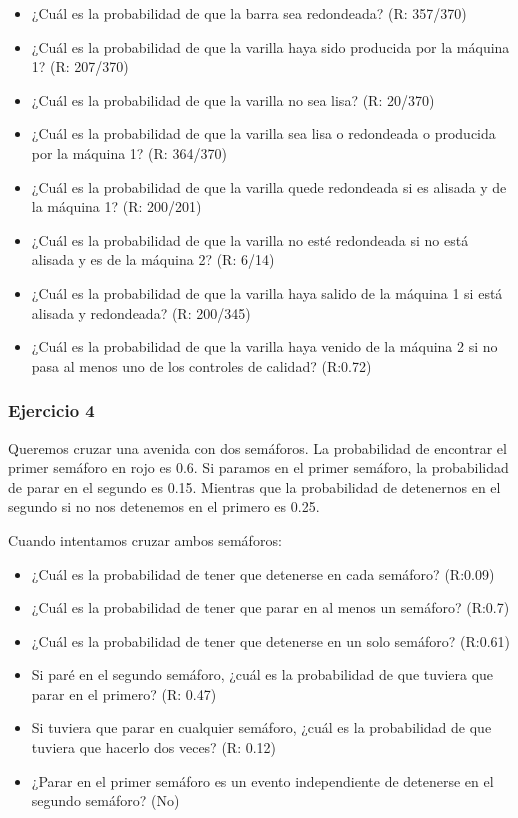 \documentclass[
]{book}
\providecommand{\tightlist}{%
  \setlength{\itemsep}{0pt}\setlength{\parskip}{0pt}}
\begin{document}
\begin{itemize}
\tightlist
\item
  ¿Cuál es la probabilidad de que la barra sea redondeada? (R: 357/370)
\item
  ¿Cuál es la probabilidad de que la varilla haya sido producida por la máquina 1? (R: 207/370)
\item
  ¿Cuál es la probabilidad de que la varilla no sea lisa? (R: 20/370)
\item
  ¿Cuál es la probabilidad de que la varilla sea lisa o redondeada o producida por la máquina 1? (R: 364/370)
\item
  ¿Cuál es la probabilidad de que la varilla quede redondeada si es alisada y de la máquina 1? (R: 200/201)
\item
  ¿Cuál es la probabilidad de que la varilla no esté redondeada si no está alisada y es de la máquina 2? (R: 6/14)
\item
  ¿Cuál es la probabilidad de que la varilla haya salido de la máquina 1 si está alisada y redondeada? (R: 200/345)
\item
  ¿Cuál es la probabilidad de que la varilla haya venido de la máquina 2 si no pasa al menos uno de los controles de calidad? (R:0.72)
\end{itemize}

\hypertarget{ejercicio-4}{%
\subsubsection{Ejercicio 4}\label{ejercicio-4}}

Queremos cruzar una avenida con dos semáforos. La probabilidad de encontrar el primer semáforo en rojo es 0.6. Si paramos en el primer semáforo, la probabilidad de parar en el segundo es 0.15. Mientras que la probabilidad de detenernos en el segundo si no nos detenemos en el primero es 0.25.

Cuando intentamos cruzar ambos semáforos:

\begin{itemize}
\tightlist
\item
  ¿Cuál es la probabilidad de tener que detenerse en cada semáforo? (R:0.09)
\item
  ¿Cuál es la probabilidad de tener que parar en al menos un semáforo? (R:0.7)
\item
  ¿Cuál es la probabilidad de tener que detenerse en un solo semáforo? (R:0.61)
\item
  Si paré en el segundo semáforo, ¿cuál es la probabilidad de que tuviera que parar en el primero? (R: 0.47)
\item
  Si tuviera que parar en cualquier semáforo, ¿cuál es la probabilidad de que tuviera que hacerlo dos veces? (R: 0.12)
\item
  ¿Parar en el primer semáforo es un evento independiente de detenerse en el segundo semáforo? (No)
\end{itemize}
\end{document}
